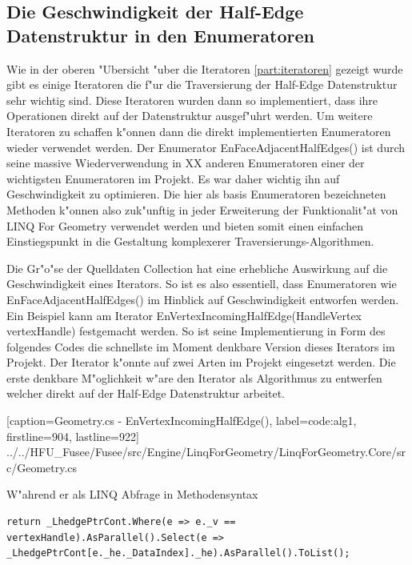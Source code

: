 \documentclass[pagesize, paper=a4, fontsize=12pt,titlepage=true, headings=small, headnosepline, abstractoff, liststotoc, nochapterprefix, plainheadsepline]{scrreprt}
\newcommand{\LFGS}{LINQ For Geometry }
\newcommand{\HES}{Half-Edge Datenstruktur }
\begin{document}
\subsection {Die Geschwindigkeit der Half-Edge Datenstruktur in den Enumeratoren}
Wie in der oberen "Ubersicht "uber die Iteratoren \ref{part:iteratoren} gezeigt wurde gibt es einige Iteratoren die f"ur die Traversierung der \HES sehr wichtig sind. Diese Iteratoren wurden dann so implementiert, dass ihre Operationen direkt auf der Datenstruktur ausgef"uhrt werden. Um weitere Iteratoren zu schaffen k"onnen dann die direkt implementierten Enumeratoren wieder verwendet werden. Der Enumerator EnFaceAdjacentHalfEdges() ist durch seine massive Wiederverwendung in XX anderen Enumeratoren einer der wichtigsten Enumeratoren im Projekt. Es war daher wichtig ihn auf Geschwindigkeit zu optimieren. Die hier als basis Enumeratoren bezeichneten Methoden k"onnen also zuk"unftig in jeder Erweiterung der Funktionalit"at von \LFGS verwendet werden und bieten somit einen einfachen Einstiegspunkt in die Gestaltung komplexerer Traversierungs-Algorithmen.

Die Gr"o"se der Quelldaten Collection hat eine erhebliche Auswirkung auf die Geschwindigkeit eines Iterators. So ist es also essentiell, dass Enumeratoren wie EnFaceAdjacentHalfEdges() im Hinblick auf Geschwindigkeit entworfen werden. Ein Beispiel kann am Iterator EnVertexIncomingHalfEdge(HandleVertex vertexHandle) festgemacht werden. So ist seine Implementierung in Form des folgendes Codes die schnellste im Moment denkbare Version dieses Iterators im Projekt. Der Iterator k"onnte auf zwei Arten im Projekt eingesetzt werden. Die erste denkbare M"oglichkeit w"are den Iterator als Algorithmus zu entwerfen welcher direkt auf der \HES arbeitet.

			[caption={Geometry.cs - EnVertexIncomingHalfEdge()}, label=code:alg1, firstline=904, lastline=922]
			{../../HFU_Fusee/Fusee/src/Engine/LinqForGeometry/LinqForGeometry.Core/src/Geometry.cs}

W"ahrend er als LINQ Abfrage in Methodensyntax
\begin{lstlisting}[label={code:alg3}]
return _LhedgePtrCont.Where(e => e._v == vertexHandle).AsParallel().Select(e => _LhedgePtrCont[e._he._DataIndex]._he).AsParallel().ToList();
\end{lstlisting}
\end{document}
